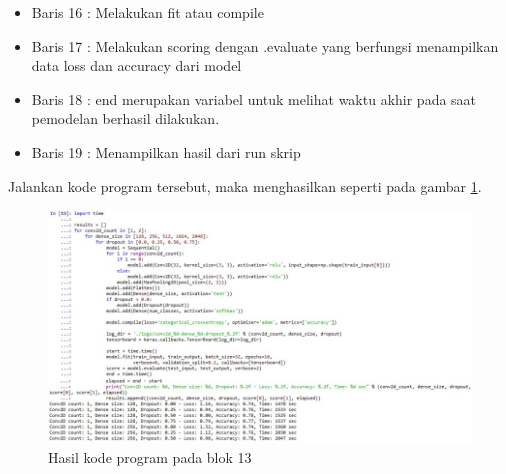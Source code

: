 \begin{enumerate}
\begin{itemize}
	\item Baris 16	: Melakukan fit atau compile 
	\item Baris 17	: Melakukan scoring dengan .evaluate yang berfungsi menampilkan data loss dan accuracy dari model
	\item Baris 18	: end merupakan variabel untuk melihat waktu akhir pada saat pemodelan berhasil dilakukan.
	\item Baris 19	: Menampilkan hasil dari run skrip
	\end{itemize}
	\par Jalankan kode program tersebut, maka menghasilkan seperti pada gambar \ref{andri13}.
		\begin{figure}[!hbtp]
		\centering
		\includegraphics[scale=0.5]{figures/chapter7/andri13.jpg}
		\caption{Hasil kode program pada blok 13}
		\label{andri13}
		\end{figure}


\end{enumerate}
